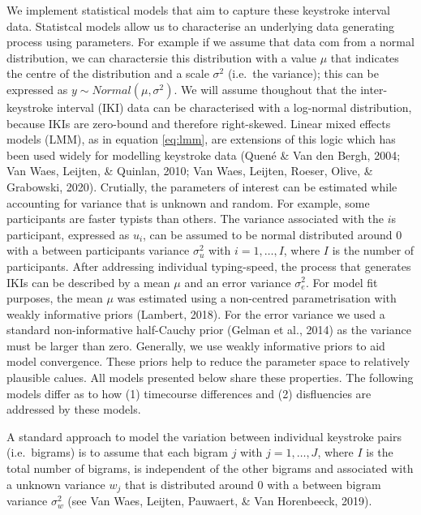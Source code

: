 \documentclass[english,jou,floatsintext]{apa7}
\begin{document}
We implement statistical models that aim to capture these keystroke interval data. Statistcal models allow us to characterise an underlying data generating process using parameters. For example if we assume that data com from a normal distribution, we can charactersie this distribution with a value \(\mu\) that indicates the centre of the distribution and a scale \(\sigma^2\) (i.e.~the variance); this can be expressed as \(y \sim Normal(\mu, \sigma^2)\). We will assume thoughout that the inter-keystroke interval (IKI) data can be characterised with a log-normal distribution, because IKIs are zero-bound and therefore right-skewed. Linear mixed effects models (LMM), as in equation \ref{eq:lmm}, are extensions of this logic which has been used widely for modelling keystroke data (Quené \& Van den Bergh, 2004; Van Waes, Leijten, \& Quinlan, 2010; Van Waes, Leijten, Roeser, Olive, \& Grabowski, 2020). Crutially, the parameters of interest can be estimated while accounting for variance that is unknown and random. For example, some participants are faster typists than others. The variance associated with the \(i\)s participant, expressed as \(u_i\), can be assumed to be normal distributed around 0 with a between participants variance \(\sigma_u^2\) with \(i = 1, \dots, I\), where \(I\) is the number of participants. After addressing individual typing-speed, the process that generates IKIs can be described by a mean \(\mu\) and an error variance \(\sigma_e^2\). For model fit purposes, the mean \(\mu\) was estimated using a non-centred parametrisation with weakly informative priors (Lambert, 2018). For the error variance we used a standard non-informative half-Cauchy prior (Gelman et al., 2014) as the variance must be larger than zero. Generally, we use weakly informative priors to aid model convergence. These priors help to reduce the parameter space to relatively plausible calues. All models presented below share these properties. The following models differ as to how (1) timecourse differences and (2) disfluencies are addressed by these models.

A standard approach to model the variation between individual keystroke pairs (i.e.~bigrams) is to assume that each bigram \(j\) with \(j = 1, \dots, J\), where \(I\) is the total number of bigrams, is independent of the other bigrams and associated with a unknown variance \(w_j\) that is distributed around 0 with a between bigram variance \(\sigma_w^2\) (see Van Waes, Leijten, Pauwaert, \& Van Horenbeeck, 2019).
\end{document}
